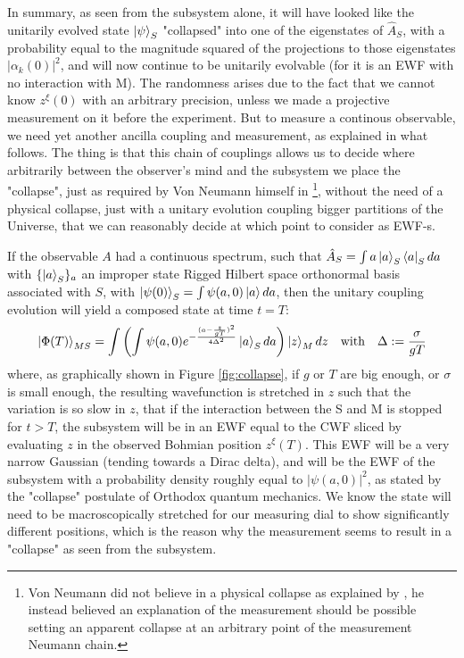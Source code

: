 \documentclass[11pt, a4paper]{article} %
\begin{document}
In summary, as seen from the subsystem alone, it will have looked like the unitarily evolved state $\ket{\psi}_S$ "collapsed" into one of the eigenstates of $\hat{A}_S$, with a probability equal to the magnitude squared of the projections to those eigenstates $|\alpha_k(0)|^2$, and will now continue to be unitarily evolvable (for it is an EWF with no interaction with M). The randomness arises due to the fact that we cannot know $z^\xi(0)$ with an arbitrary precision, unless we made a projective measurement on it before the experiment. But to measure a continous observable, we need yet another ancilla coupling and measurement, as explained in what follows. The thing is that this chain of couplings allows us to decide where arbitrarily between the observer's mind and the subsystem we place the "collapse", just as required by Von Neumann himself in \cite{VonNeumann}\footnote{Von Neumann did not believe in a physical collapse as explained by \cite{NeumannNoCollapse}, he instead believed an explanation of the measurement should be possible setting an apparent collapse at an arbitrary point of the measurement Neumann chain.}, without the need of a physical collapse, just with a unitary evolution coupling bigger partitions of the Universe, that we can reasonably decide at which point to consider as EWF-s.

If the observable $A$ had a continuous spectrum, such that $\hat{A}_S=\int a\ket{a}_S\bra{a}_Sda$ with $\{\ket{a}_S\}_a$ an improper state Rigged Hilbert space orthonormal basis associated with $S$, with $\ket{\psi(0)}_S=\int\psi(a,0)\ket{a}da$, then the unitary coupling evolution will yield a composed state at time $t=T$:
\begin{equation}
\ket{\Phi(T)}_{MS}=\int\qty(\int\psi(a,0)e^{-\frac{(a-\frac{z}{gT})^2}{4\Delta^2}}\ket{a}_S da)\ket{z}_Mdz\quad \text{with} \quad \Delta:=\frac{\sigma}{gT}
\end{equation}
where, as graphically shown in Figure \ref{fig:collapse}, if $g$ or $T$ are big enough, or $\sigma$ is small enough, the resulting wavefunction is stretched in $z$ such that the variation is so slow in $z$, that if the interaction between the S and M is stopped for $t>T$, the subsystem will be in an EWF equal to the CWF sliced by evaluating $z$ in the observed Bohmian position $z^\xi(T)$. This EWF will be a very narrow Gaussian (tending towards a Dirac delta), and will be the EWF of the subsystem with a probability density roughly equal to $|\psi(a,0)|^2$, as stated by the "collapse" postulate of Orthodox quantum mechanics. We know the state will need to be macroscopically stretched for our measuring dial to show significantly different positions, which is the reason why the measurement seems to result in a "collapse" as seen from the subsystem.
\end{document}

